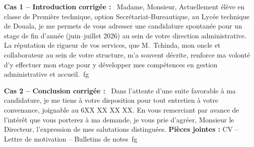 \documentclass[11pt]{article}
\begin{document}
\begin{corrige}[Exercice n1]
\textbf{Cas 1 -- Introduction corrigée :}
\og~Madame, Monsieur,
Actuellement élève en classe de Première technique, option Secrétariat-Bureautique, au Lycée technique de Douala, je me permets de vous adresser une candidature spontanée pour un stage de fin d'année (juin--juillet 2026) au sein de votre direction administrative. La réputation de rigueur de vos services, que M.~Tchinda, mon oncle et collaborateur au sein de votre structure, m'a souvent décrite, renforce ma volonté d'y effectuer mon stage pour y développer mes compétences en gestion administrative et accueil.~\/fg

\textbf{Cas 2 -- Conclusion corrigée :}
\og~Dans l'attente d'une suite favorable à ma candidature, je me tiens à votre disposition pour tout entretien à votre convenance, joignable au 6XX XX XX XX.
En vous remerciant par avance de l'intérêt que vous porterez à ma demande, je vous prie d'agréer, Monsieur le Directeur, l'expression de mes salutations distinguées.
\textbf{Pièces jointes :} CV -- Lettre de motivation -- Bulletins de notes~\/fg
\end{corrige}
\end{document}
